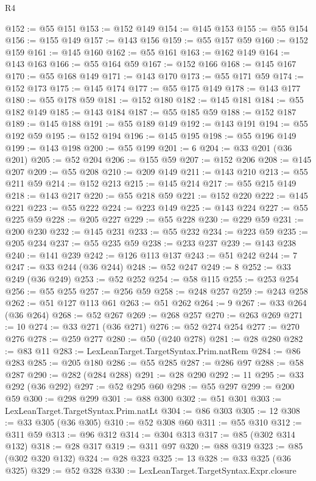 \begin{lexlean}{R4}
\begin{coremodule}
@152 := @55 @151
@153 := @152 @149
@154 := @145 @153
@155 := @55 @154
@156 := @155 @149
@157 := @143 @156
@159 := @55 @157 @59
@160 := @152 @159
@161 := @145 @160
@162 := @55 @161
@163 := @162 @149
@164 := @143 @163
@166 := @55 @164 @59
@167 := @152 @166
@168 := @145 @167
@170 := @55 @168 @149
@171 := @143 @170
@173 := @55 @171 @59
@174 := @152 @173
@175 := @145 @174
@177 := @55 @175 @149
@178 := @143 @177
@180 := @55 @178 @59
@181 := @152 @180
@182 := @145 @181
@184 := @55 @182 @149
@185 := @143 @184
@187 := @55 @185 @59
@188 := @152 @187
@189 := @145 @188
@191 := @55 @189 @149
@192 := @143 @191
@194 := @55 @192 @59
@195 := @152 @194
@196 := @145 @195
@198 := @55 @196 @149
@199 := @143 @198
@200 := @55 @199
@201 := 6
@204 := @33 @201 (@36 @201)
@205 := @52 @204
@206 := @155 @59
@207 := @152 @206
@208 := @145 @207
@209 := @55 @208
@210 := @209 @149
@211 := @143 @210
@213 := @55 @211 @59
@214 := @152 @213
@215 := @145 @214
@217 := @55 @215 @149
@218 := @143 @217
@220 := @55 @218 @59
@221 := @152 @220
@222 := @145 @221
@223 := @55 @222
@224 := @223 @149
@225 := @143 @224
@227 := @55 @225 @59
@228 := @205 @227
@229 := @55 @228
@230 := @229 @59
@231 := @200 @230
@232 := @145 @231
@233 := @55 @232
@234 := @223 @59
@235 := @205 @234
@237 := @55 @235 @59
@238 := @233 @237
@239 := @143 @238
@240 := @141 @239
@242 := @126 @113 @137
@243 := @51 @242
@244 := 7
@247 := @33 @244 (@36 @244)
@248 := @52 @247
@249 := 8
@252 := @33 @249 (@36 @249)
@253 := @52 @252
@254 := @58 @115
@255 := @253 @254
@256 := @55 @255
@257 := @256 @59
@258 := @248 @257
@259 := @243 @258
@262 := @51 @127 @113 @61
@263 := @51 @262
@264 := 9
@267 := @33 @264 (@36 @264)
@268 := @52 @267
@269 := @268 @257
@270 := @263 @269
@271 := 10
@274 := @33 @271 (@36 @271)
@276 := @52 @274 @254
@277 := @270 @276
@278 := @259 @277
@280 := @50 (@240 @278)
@281 := @28 @280
@282 := @83 @11
@283 := LexLeanTarget.TargetSyntax.Prim.natRem
@284 := @86 @283
@285 := @205 @180
@286 := @55 @285
@287 := @286 @97
@288 := @58 @287
@290 := @282 (@284 @288)
@291 := @28 @290
@292 := 11
@295 := @33 @292 (@36 @292)
@297 := @52 @295 @60
@298 := @55 @297
@299 := @200 @59
@300 := @298 @299
@301 := @88 @300
@302 := @51 @301
@303 := LexLeanTarget.TargetSyntax.Prim.natLt
@304 := @86 @303
@305 := 12
@308 := @33 @305 (@36 @305)
@310 := @52 @308 @60
@311 := @55 @310
@312 := @311 @59
@313 := @96 @312
@314 := @304 @313
@317 := @85 (@302 @314 @132)
@318 := @28 @317
@319 := @311 @97
@320 := @88 @319
@323 := @85 (@302 @320 @132)
@324 := @28 @323
@325 := 13
@328 := @33 @325 (@36 @325)
@329 := @52 @328
@330 := LexLeanTarget.TargetSyntax.Expr.closure

\end{coremodule}
\end{lexlean}
